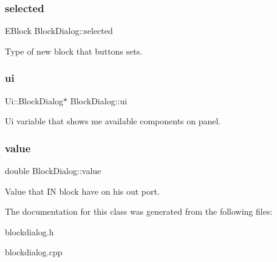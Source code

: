 \subsubsection{\texorpdfstring{selected}{selected}}
{\footnotesize\ttfamily E\+Block Block\+Dialog\+::selected\hspace{0.3cm}{\ttfamily [private]}}

Type of new block that buttons sets. \mbox{\label{classBlockDialog_ad8e54f70336f615f84a19cf59b4bb420}} 
\subsubsection{\texorpdfstring{ui}{ui}}
{\footnotesize\ttfamily Ui\+::\+Block\+Dialog$\ast$ Block\+Dialog\+::ui\hspace{0.3cm}{\ttfamily [private]}}

Ui variable that shows me available components on panel. \mbox{\label{classBlockDialog_ad0c5a84d24461a66fc604159306cd65c}} 
\subsubsection{\texorpdfstring{value}{value}}
{\footnotesize\ttfamily double Block\+Dialog\+::value\hspace{0.3cm}{\ttfamily [private]}}

Value that IN block have on his out port. 

The documentation for this class was generated from the following files\+:\begin{DoxyCompactItemize}
\item 
blockdialog.\+h\item 
blockdialog.\+cpp\end{DoxyCompactItemize}
